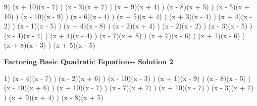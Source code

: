 \documentclass{article}%
\begin{document}
9) (x + 10)(x - 7)%
) (x - 3)(x + 7)%
) (x + 9)(x + 4)%
) (x - 8)(x + 5)%
) (x - 5)(x + 10)%
) (x - 10)(x - 9)%
) (x - 6)(x - 4)%
) (x + 5)(x + 4)%
) (x + 3)(x - 4)%
) (x + 4)(x - 2)%
) (x - 1)(x - 5)%
) (x + 4)(x - 8)%
) (x - 2)(x + 4)%
) (x - 2)(x - 2)%
) (x - 3)(x - 5)%
) (x - 4)(x - 4)%
) (x + 4)(x - 4)%
) (x - 7)(x + 8)%
) (x + 7)(x - 6)%
) (x + 1)(x - 6)%
) (x + 8)(x - 3)%
) (x + 5)(x - 5)%
\newline%
\newpage%
\large%
\begin{center}%
\textbf{Factoring Basic Quadratic Equations- Solution 2}%
\newline%
\end{center} \normalsize%
1) (x - 4)(x - 7)%
) (x - 2)(x + 6)%
) (x - 10)(x - 3)%
) (x + 1)(x - 9)%
) (x - 8)(x - 5)%
) (x - 10)(x + 6)%
) (x + 10)(x - 7)%
) (x - 7)(x + 7)%
) (x + 10)(x - 7)%
) (x - 3)(x + 7)%
) (x + 9)(x + 4)%
) (x - 8)(x + 5)%
\newline%
\end{document}
